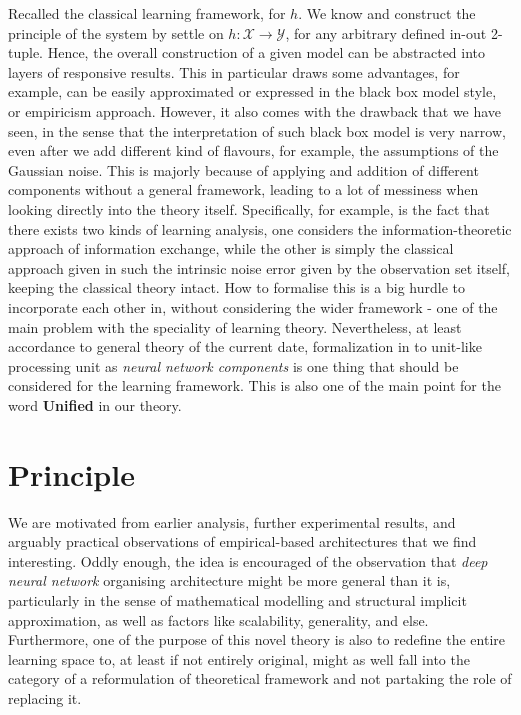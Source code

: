Recalled the classical learning framework, for $h$. We know and construct the principle of the system by settle on $h:\mathcal{X}\to \mathcal{Y}$, for any arbitrary defined in-out 2-tuple. Hence, the overall construction of a given model can be abstracted into layers of responsive results. This in particular draws some advantages, for example, can be easily approximated or expressed in the black box model style, or empiricism approach. However, it also comes with the drawback that we have seen, in the sense that the interpretation of such black box model is very narrow, even after we add different kind of flavours, for example, the assumptions of the Gaussian noise. This is majorly because of applying and addition of different components without a general framework, leading to a lot of messiness when looking directly into the theory itself. Specifically, for example, is the fact that there exists two kinds of learning analysis, one considers the information-theoretic approach of information exchange, while the other is simply the classical approach given in such the intrinsic noise error given by the observation set itself, keeping the classical theory intact. How to formalise this is a big hurdle to incorporate each other in, without considering the wider framework - one of the main problem with the speciality of learning theory. Nevertheless, at least accordance to general theory of the current date, formalization in to unit-like processing unit as \textit{neural network components} is one thing that should be considered for the learning framework. This is also one of the main point for the word \textbf{Unified} in our theory. 

\section{Principle}

We are motivated from earlier analysis, further experimental results, and arguably practical observations of empirical-based architectures that we find interesting. Oddly enough, the idea is encouraged of the observation that \textit{deep neural network} organising architecture might be more general than it is, particularly in the sense of mathematical modelling and structural implicit approximation, as well as factors like scalability, generality, and else. Furthermore, one of the purpose of this novel theory is also to redefine the entire learning space to, at least if not entirely original, might as well fall into the category of a reformulation of theoretical framework and not partaking the role of replacing it. 

